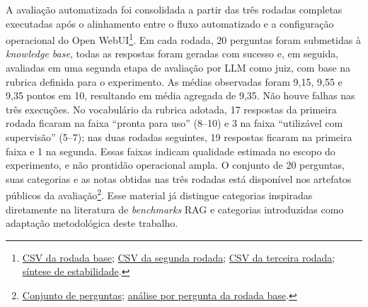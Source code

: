 A avaliação automatizada foi consolidada a partir das três rodadas completas executadas após o alinhamento entre o fluxo automatizado e a configuração operacional do Open WebUI\footnote{\href{https://github.com/fabriciosantana/mcdia/blob/main/05-iag/4-project/eval/results/rag_eval_20260416T172816Z.csv}{CSV da rodada base}; \href{https://github.com/fabriciosantana/mcdia/blob/main/05-iag/4-project/eval/results/rag_eval_20260416T182240Z.csv}{CSV da segunda rodada}; \href{https://github.com/fabriciosantana/mcdia/blob/main/05-iag/4-project/eval/results/rag_eval_20260416T232921Z.csv}{CSV da terceira rodada}; \href{https://github.com/fabriciosantana/mcdia/blob/main/05-iag/4-project/eval/results/stability_summary_20260417T012001Z.md}{síntese de estabilidade}.}. Em cada rodada, 20 perguntas foram submetidas à \textit{knowledge base}, todas as respostas foram geradas com sucesso e, em seguida, avaliadas em uma segunda etapa de avaliação por LLM como juiz, com base na rubrica definida para o experimento. As médias observadas foram 9,15, 9,55 e 9,35 pontos em 10, resultando em média agregada de 9,35. Não houve falhas nas três execuções. No vocabulário da rubrica adotada, 17 respostas da primeira rodada ficaram na faixa ``pronta para uso'' (8--10) e 3 na faixa ``utilizável com supervisão'' (5--7); nas duas rodadas seguintes, 19 respostas ficaram na primeira faixa e 1 na segunda. Essas faixas indicam qualidade estimada no escopo do experimento, e não prontidão operacional ampla. O conjunto de 20 perguntas, suas categorias e as notas obtidas nas três rodadas está disponível nos artefatos públicos da avaliação\footnote{\href{https://github.com/fabriciosantana/mcdia/blob/main/05-iag/4-project/eval/discursos_questions.json}{Conjunto de perguntas}; \href{https://github.com/fabriciosantana/mcdia/blob/main/05-iag/4-project/eval/results/rag_eval_20260416T172816Z.question_analysis.md}{análise por pergunta da rodada base}.}. Esse material já distingue categorias inspiradas diretamente na literatura de \textit{benchmarks} RAG \parencite{zhuEtAl2025rageval} e categorias introduzidas como adaptação metodológica deste trabalho.

